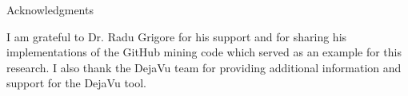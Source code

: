 \makeatletter
{}
{}
\makeatother
\thispagestyle{empty}

\vspace*{20mm}

\begin{center}
\makeatletter
{}
{ Acknowledgments}
\makeatother
\end{center}

\vspace{10mm}

I am grateful to Dr. Radu Grigore for his support and for sharing his implementations of the GitHub mining code which served as an example for this research. I also thank the DejaVu team for providing additional information and support for the DejaVu tool.

\cleardoublepage{}
